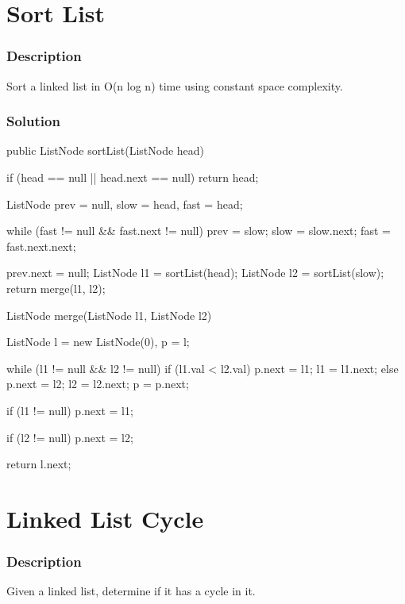 \newpage

\section{Sort List} %

\subsubsection{Description}
Sort a linked list in O(n log n) time using constant space complexity.

\subsubsection{Solution}

\begin{Code}
public ListNode sortList(ListNode head) {
    if (head == null || head.next == null)
        return head;

    ListNode prev = null, slow = head, fast = head;

    while (fast != null && fast.next != null) {
        prev = slow;
        slow = slow.next;
        fast = fast.next.next;
    }

    prev.next = null;
    ListNode l1 = sortList(head);
    ListNode l2 = sortList(slow);
    return merge(l1, l2);
}

ListNode merge(ListNode l1, ListNode l2) {
    ListNode l = new ListNode(0), p = l;

    while (l1 != null && l2 != null) {
        if (l1.val < l2.val) {
            p.next = l1;
            l1 = l1.next;
        } else {
            p.next = l2;
            l2 = l2.next;
        }
        p = p.next;
    }

    if (l1 != null)
        p.next = l1;

    if (l2 != null)
        p.next = l2;

    return l.next;
}
\end{Code}

\newpage

\section{Linked List Cycle} %

\subsubsection{Description}
Given a linked list, determine if it has a cycle in it.

